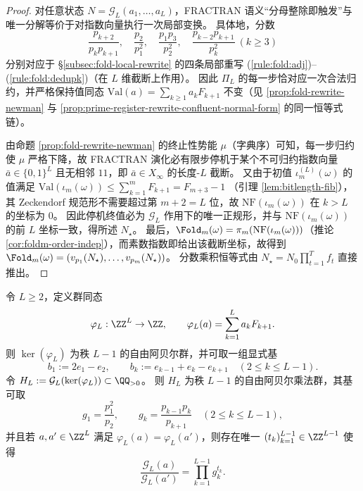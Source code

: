 \begin{proof}
对任意状态 \(N=\mathcal G_L(a_1,\dots,a_L)\)，FRACTRAN 语义“分母整除即触发”与唯一分解等价于对指数向量执行一次局部变换。
具体地，分数
\[
\frac{p_{k+2}}{p_kp_{k+1}},\quad
\frac{p_2}{p_1^2},\quad
\frac{p_1p_3}{p_2^2},\quad
\frac{p_{k-2}p_{k+1}}{p_k^2}\ (k\ge 3)
\]
分别对应于 \S\ref{subsec:fold-local-rewrite} 的四条局部重写
(\ref{rule:fold:adj})--(\ref{rule:fold:dedupk})（在 \(L\) 维截断上作用）。
因此 \(\Pi_L\) 的每一步恰对应一次合法归约，并严格保持值同态
\(
\mathrm{Val}(a)=\sum_{k\ge 1}a_kF_{k+1}
\)
不变（见 \ref{prop:fold-rewrite-newman} 与 \ref{prop:prime-register-rewrite-confluent-normal-form} 的同一恒等式链）。

由命题 \ref{prop:fold-rewrite-newman} 的终止性势能 \(\mu\)（字典序）可知，每一步归约使 \(\mu\) 严格下降，故 FRACTRAN 演化必有限步停机于某个不可归约指数向量 \(\bar a\in\{0,1\}^L\) 且无相邻 \(11\)，即 \(\bar a\in X_\infty\) 的长度-\(L\) 截断。
又由于初值 \(\iota_m^{(L)}(\omega)\) 的值满足
\(
\mathrm{Val}(\iota_m(\omega))\le \sum_{k=1}^{m}F_{k+1}=F_{m+3}-1
\)
（引理 \ref{lem:bitlength-fib}），其 Zeckendorf 规范形不需要超过第 \(m+2=L\) 位，故 \(\mathrm{NF}(\iota_m(\omega))\) 在 \(k>L\) 的坐标为 \(0\)。
因此停机终值必为 \(\mathcal G_L\) 作用下的唯一正规形，并与 \(\mathrm{NF}(\iota_m(\omega))\) 的前 \(L\) 坐标一致，得所述 \(N_\star\)。
最后，\(\Fold_m(\omega)=\pi_m(\mathrm{NF}(\iota_m(\omega)))\)（推论 \ref{cor:foldm-order-indep}），而素数指数即给出该截断坐标，故得到 \(\Fold_m(\omega)=(v_{p_1}(N_\star),\dots,v_{p_m}(N_\star))\)。
分数乘积恒等式由 \(N_\star=N_0\prod_{t=1}^{T}f_t\) 直接推出。
\end{proof}

\begin{theorem}\label{thm:fib-kernel-basis-finite-depth}
令 \(L\ge 2\)，定义群同态
\[
\varphi_L:\ZZ^L\to\ZZ,\qquad \varphi_L(a)=\sum_{k=1}^{L} a_k F_{k+1}.
\]
则 \(\ker(\varphi_L)\) 为秩 \(L-1\) 的自由阿贝尔群，并可取一组显式基
\[
b_1:=2e_1-e_2,\qquad b_k:=e_{k-1}+e_k-e_{k+1}\quad (2\le k\le L-1).
\]
令
\(
H_L:=\mathcal G_L(\ker(\varphi_L))\subset\QQ_{>0}
\)。
则 \(H_L\) 为秩 \(L-1\) 的自由阿贝尔乘法群，其基可取
\[
g_1=\frac{p_1^2}{p_2},\qquad g_k=\frac{p_{k-1}p_k}{p_{k+1}}\quad(2\le k\le L-1),
\]
并且若 \(a,a'\in\ZZ^L\) 满足 \(\varphi_L(a)=\varphi_L(a')\)，则存在唯一 \((t_k)_{k=1}^{L-1}\in\ZZ^{L-1}\) 使得
\[
\frac{\mathcal G_L(a)}{\mathcal G_L(a')}=\prod_{k=1}^{L-1} g_k^{t_k}.
\]
\end{theorem}

